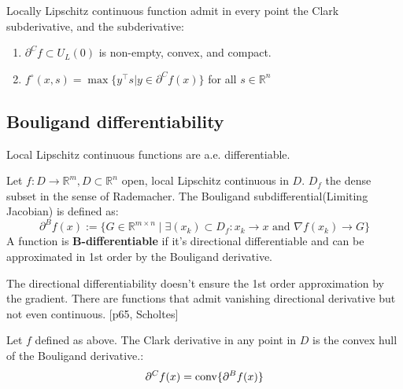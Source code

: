 \begin{theorem}
	Locally Lipschitz continuous function admit in every point the Clark subderivative, and the subderivative:
	\begin{enumerate}
		\item $\partial^C f \subset U_L(0)$ is non-empty, convex, and compact.
		\item $f^\circ(x, s) = \max\{y^\top s | y \in \partial^C f(x) \}$ for all $s \in \mathbb{R}^n$
	\end{enumerate}
\end{theorem}

\begin{theorem}
	
\end{theorem}



\subsection{Bouligand differentiability}

\begin{theorem}
Local Lipschitz continuous functions are a.e. differentiable.
\end{theorem}

\begin{definition}
Let $f: D \longrightarrow \mathbb{R}^m, D \subset \mathbb{R}^n$ open, local Lipschitz continuous in $D$. $D_f$ the dense subset in the sense of Rademacher. The Bouligand subdifferential(Limiting Jacobian) is defined as:
	\begin{equation*}
		\partial^B f(x) := \{ G \in \mathbb{R}^{m \times n} \mid \exists (x_k) \subset D_f: x_k \rightarrow x \text{ and } \nabla f(x_k) \rightarrow G \}
	\end{equation*} 
	A function is \textbf{B-differentiable} if it's directional differentiable and can be approximated in 1st order by the Bouligand derivative. 
\end{definition}
\begin{remark}
The directional differentiability doesn't ensure the 1st order approximation by the gradient. There are functions that admit vanishing directional derivative but not even continuous. [p65, Scholtes]	
\end{remark}


\begin{theorem}
	Let $f$ defined as above. The Clark derivative in any point in $D$ is the convex hull of the Bouligand derivative.:
	\begin{equation*}
		\partial^C f(x) = \operatorname*{conv}\{ \partial^B f(x) \}
	\end{equation*}
\end{theorem}

